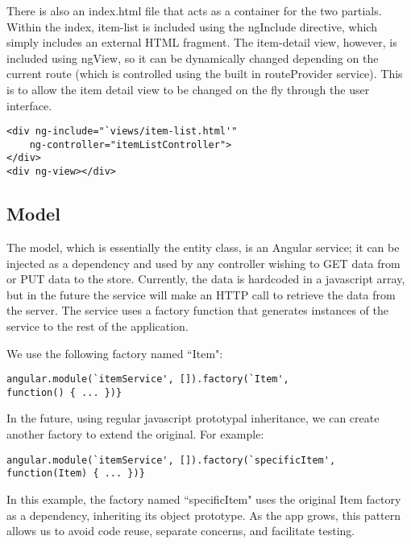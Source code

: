 \documentclass[letterpaper, 12pt]{article}
\begin{document}
\begin{itemize}
\noindent There is also an index.html file that acts as a container for the two partials. Within the index, item-list is included using the ngInclude directive, which simply includes an external HTML fragment. The item-detail view, however, is included using ngView, so it can be dynamically changed depending on the current route (which is controlled using the built in routeProvider service). This is to allow the item detail view to be changed on the fly through the user interface.

\vspace{2mm}
\vspace{-3mm}\begin{verbatim}
<div ng-include="`views/item-list.html'"
    ng-controller="itemListController">
</div>
<div ng-view></div>
\end{verbatim}

\subsection{Model}
\noindent The model, which is essentially the entity class, is an Angular service; it can be injected as a dependency and used by any controller wishing to GET data from or PUT data to the store. Currently, the data is hardcoded in a javascript array, but in the future the service will make an HTTP call to retrieve the data from the server. The service uses a factory function that generates instances of the service to the rest of the application.

\noindent We use the following factory named ``Item":

\vspace{2mm}
\vspace{-3mm}\begin{verbatim}
angular.module(`itemService', []).factory(`Item',
function() { ... })}
\end{verbatim}

\noindent In the future, using regular javascript prototypal inheritance, we can create another factory to extend the original. For example:

\vspace{-3mm}\begin{verbatim}
angular.module(`itemService', []).factory(`specificItem',
function(Item) { ... })}
\end{verbatim}


\noindent In this example, the factory named ``specificItem" uses the original Item factory as a dependency, inheriting its object prototype. As the app grows, this pattern allows us to avoid code reuse, separate concerns, and facilitate testing.


\end{itemize}
\end{document}
